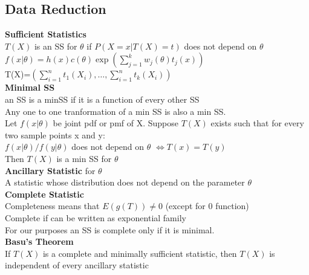 \documentclass{article}
\begin{document}
\begin{flushleft}
\section*{Data Reduction}
\textbf{Sufficient Statistics}\\
$T(X)$ is an SS for $\theta$ if $P(X=x|T(X)=t)$ does not depend on $\theta$\\
$f(x|\theta)=h(x)c(\theta)\exp\left(\sum_{j=1}^{k}w_j(\theta)t_j(x)\right)$\\
T(X)=$\left(\sum_{i=1}^{n}t_1(X_i),\dots ,\sum_{i=1}^{n}t_k(X_i)\right)$\\
\textbf{Minimal SS}\\
an SS is a minSS if it is a function of every other SS\\
Any one to one tranformation of a min SS is also a min SS.\\
Let $f(x|\theta)$ be joint pdf or pmf of X. Suppose $T(X)$ exists such that for every two sample points x and y:\\
$f(x|\theta)/f(y|\theta)$ does not depend on $\theta$ $\iff T(x)=T(y)$\\
Then $T(X)$ is a min SS for $\theta$\\
\textbf{Ancillary Statistic} for $\theta$\\
A statistic whose distribution does not depend on the parameter $\theta$\\
\textbf{Complete Statistic}\\
Completeness means that $E(g(T))\neq 0$ (except for 0 function)\\
Complete if can be written as exponential family\\
For our purposes an SS is complete only if it is minimal.\\
\textbf{Basu's Theorem}\\
If $T(X)$ is a complete and minimally sufficient statistic, then $T(X)$ is independent of every ancillary statistic\\

\end{flushleft}
\end{document}
